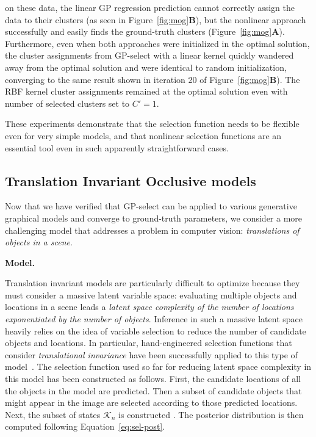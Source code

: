 \documentclass[12pt]{article}
\newcommand{\Kn}{\mathcal{K}_{n}}
\begin{document}
 on these data, the linear GP regression prediction cannot correctly assign the data to their clusters (as seen in Figure~\ref{fig:mog}\textbf{B}), but the nonlinear approach successfully and easily finds the ground-truth clusters (Figure~\ref{fig:mog}\textbf{A}).
Furthermore, even when both approaches were initialized in the optimal solution, the cluster assignments from GP-select with a linear kernel quickly wandered away from the optimal solution and were identical to random initialization, converging to the same result shown in iteration 20 of Figure~\ref{fig:mog}\textbf{B}).
The RBF kernel cluster assignments remained at the optimal solution even with number of selected clusters set to $C'=1$.

These experiments demonstrate that the selection function needs to be flexible even
for very simple models, and that nonlinear selection functions are an essential tool
even in such apparently straightforward cases.


\subsection{Translation Invariant Occlusive models}
\label{invec}


Now that we have verified that GP-select can be applied to various generative graphical models and converge to ground-truth parameters, we consider a more challenging model that addresses a problem in computer vision: \emph{translations of objects in a scene}.

\textbf{Model.}
%

Translation invariant models are particularly difficult to optimize because they must consider a massive latent variable space: evaluating multiple objects and locations in a scene leads a \textit{latent space complexity of the number of locations exponentiated by the number of objects}.
Inference in such a massive latent space heavily relies on the idea of variable selection to reduce the number of candidate objects and locations. In particular, hand-engineered selection functions that consider \emph{translational invariance} have been successfully applied to this type of model~\citep{DaiLucke2012b,DaiLucke2014,DaiEtAl2013}.
%
The selection function used so far for reducing latent space complexity in this model has been constructed as follows.
First, the candidate locations of all the objects in the model are predicted.
Then a subset of candidate objects that might appear in the image are selected according to those predicted locations.  
Next, the subset of states $\Kn$ is constructed 
.
The posterior distribution is then computed following Equation~\eqref{eq:sel-post}.
\end{document}
